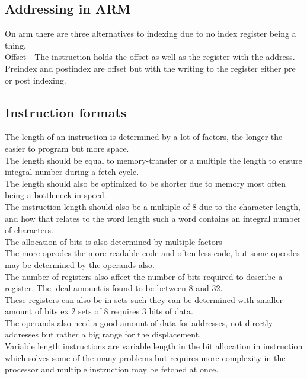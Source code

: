 \documentclass[12pt, a4paper]{article}
\begin{document}
		\subsection{Addressing in ARM}
			On arm there are three alternatives to indexing due to no index register being a thing.\\
			Offset - The instruction holds the offset as well as the register with the address.\\
			Preindex and postindex are offset but with the writing to the register either pre or post indexing.\\
		\subsection{Instruction formats}
			The length of an instruction is determined by a lot of factors, the longer the easier to program but more space.\\
			The length should be equal to memory-transfer or a multiple the length to ensure integral number during a fetch cycle.\\
			The length should also be optimized to be shorter due to memory most often being a bottleneck in speed. \\
			The instruction length should also be a multiple of 8 due to the character length, and how that relates to the word length such a word contains an integral number of characters.\\[4mm]
			The allocation of bits is also determined by multiple factors\\
			The more opcodes the more readable code and often less code, but some opcodes may be determined by the operands also.\\
			The number of registers also affect the number of bits required to describe a register. The ideal amount is found to be between 8 and 32.\\
			These registers can also be in sets such they can be determined with smaller amount of bits ex 2 sets of 8 requires 3 bits of data.\\
			The operands also need a good amount of data for addresses, not directly addresses but rather a big range for the displacement.\\
			Variable length instructions are variable length in the bit allocation in instruction which solves some of the many problems but requires more complexity in the processor and multiple instruction may be fetched at once.\\
\end{document}

